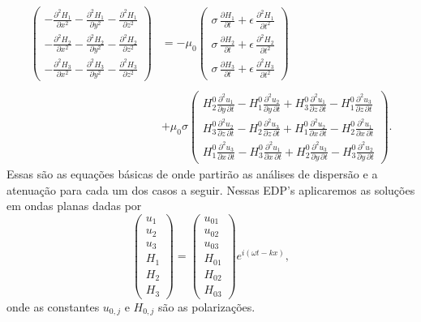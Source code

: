 \begin{align}\label{eq.disp_abertas_2}\nonumber
\begin{pmatrix}
-\frac{\partial^2H_1}{\partial x^2}-\frac{\partial^2H_1}{\partial y^2}-\frac{\partial^2H_1}{\partial z^2}\\
-\frac{\partial^2H_2}{\partial x^2}-\frac{\partial^2H_2}{\partial y^2}-\frac{\partial^2H_2}{\partial z^2}\\
-\frac{\partial^2H_3}{\partial x^2}-\frac{\partial^2H_3}{\partial y^2}-\frac{\partial^2H_3}{\partial z^2}
\end{pmatrix}
&=-\mu_0
\begin{pmatrix}
\sigma\,\frac{\partial H_1}{\partial t}+\epsilon\,\frac{\partial^2H_1}{\partial t^2}\\
\sigma\,\frac{\partial H_2}{\partial t}+\epsilon\,\frac{\partial^2H_2}{\partial t^2}\\
\sigma\,\frac{\partial H_3}{\partial t}+\epsilon\,\frac{\partial^2H_3}{\partial t^2}
\end{pmatrix}\\\\\nonumber
&+\mu_0\sigma
\begin{pmatrix}
H^0_2\frac{\partial^2u_1}{\partial y\,\partial t}-H^0_1\frac{\partial^2u_2}{\partial y\,\partial t}+H^0_3\frac{\partial^2u_1}{\partial z\,\partial t}-H^0_1\frac{\partial^2u_3}{\partial z\,\partial t}\\
H^0_3\frac{\partial^2u_2}{\partial z\,\partial t}-H^0_2\frac{\partial^2u_3}{\partial z\,\partial t}+H^0_1\frac{\partial^2u_2}{\partial x\,\partial t}-H^0_2\frac{\partial^2u_1}{\partial x\,\partial t}\\H^0_1\frac{\partial^2u_3}{\partial x\,\partial t}-H^0_3\frac{\partial^2u_1}{\partial x\,\partial t}+H^0_2\frac{\partial^2u_3}{\partial y\,\partial t}-H^0_3\frac{\partial^2u_2}{\partial y\,\partial t}
\end{pmatrix}.
\end{align}
Essas s\~ao as equa\c{c}\~oes b\'asicas de onde partir\~ao as an\'alises de dispers\~ao e a atenua\c{c}\~ao para cada um dos casos a seguir. Nessas EDP's aplicaremos as solu\c{c}\~oes em ondas planas dadas por
\begin{equation}\label{eq.ondas_planas}
\begin{pmatrix}
u_1\\
u_2\\
u_3\\
H_1\\
H_2\\
H_3
\end{pmatrix}
=
\begin{pmatrix}
u_{01}\\
u_{02}\\
u_{03}\\
H_{01}\\
H_{02}\\
H_{03}
\end{pmatrix}
e^{i(\omega t-kx)},
\end{equation}
onde as constantes $u_{0,j}$ e $H_{0,j}$ s\~ao as polariza\c{c}\~oes.


